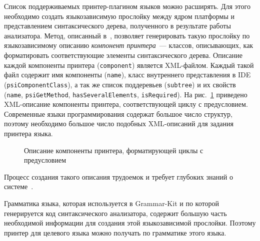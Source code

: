 Список поддерживаемых принтер-плагином языков можно расширять.
Для этого необходимо создать языкозависимую прослойку между ядром платформы и представлением синтаксического дерева, полученного в результате работы анализатора.
Метод, описанный в~\cite{paper:while}, позволяет генерировать такую прослойку по языкозависимому описанию \emph{компонент принтера}~--- классов, описывающих, как форматировать соответствующие элементы синтаксического дерева.
Описание каждой компоненты принтера (\lstinline{component}) является XML-файлом. Каждый такой файл содержит имя компоненты (\lstinline{name}), класс внутреннего представления в IDE (\lstinline{psiComponentClass}), %
а так же список поддеревьев (\lstinline{subtree}) и их свойств (\lstinline{name}, \lstinline{psiGetMethod}, \lstinline{hasSeveralElements}, \lstinline{isRequired}).
На рис.~\ref{intro:whileComponent} приведено XML-описание компоненты принтера, соответствующей циклу с предусловием.
Современные языки программирования содержат большое число структур, поэтому необходимо большое число подобных XML-описаний для задания принтера языка.
\begin{figure}[t]
    
    \caption{Описание компоненты принтера, форматирующей циклы с предусловием}
    \label{intro:whileComponent}
\end{figure}
\noindent
Процесс создания такого описания трудоемок и требует глубоких знаний о системе~\cite{paper:while}.

Грамматика языка, которая используется в Grammar-Kit и по которой генерируется код синтаксического анализатора, содержит большую часть необходимой информации для создания этой языкозависимой прослойки.
Поэтому принтер для целевого языка можно получать по грамматике этого языка.
